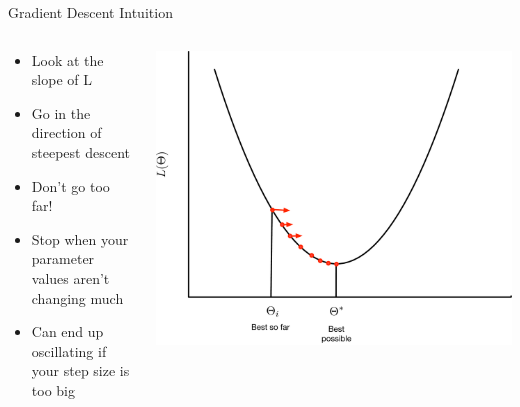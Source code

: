 \documentclass[aspectratio=169]{beamer}
\begin{document}
\begin{frame}{Gradient Descent Intuition}

\begin{columns}[T]
\begin{column}{0.5\textwidth}
\begin{itemize}
\item Look at the slope of L
\item Go in the direction of steepest descent
\item Don't go too far!
\item Stop when your parameter values aren't changing much
\item Can end up oscillating if your step size is too big
\end{itemize}
\end{column}
\begin{column}{0.5\textwidth}
\includegraphics[width=1\textwidth]{lectGD/gd1V2.pdf}
\end{column}
\end{columns}

\end{frame}
\end{document}
